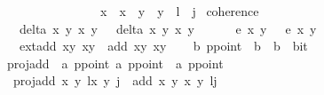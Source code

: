 \begin{isabellebody}
\ \ \ \ \ \ \ \ \ \ \ \ \ \ \ \ {\isacharparenleft}x{}\ {\isacharequal}\ x{}\ {\isasymand}\ y{}\ {\isacharequal}\ y{}\ {\isasymand}\ l\ {\isacharequal}\ j{\isacharparenright}{\isacharparenright}{\isacharbraceright}{\isachardoublequoteclose}\isanewline
\isanewline
\isanewline
{}\isamarkupfalse%
\ coherence{\isacharcolon}\isanewline
\ \ \ {\isachardoublequoteopen}delta\ x{}\ y{}\ x{}\ y{}\ {\isasymnoteq}\ {}{\isachardoublequoteclose}\ {\isachardoublequoteopen}delta{\isacharprime}\ x{}\ y{}\ x{}\ y{}\ {\isasymnoteq}\ {}{\isachardoublequoteclose}\ \isanewline
\ \ \ {\isachardoublequoteopen}e{\isacharprime}\ x{}\ y{}\ {\isacharequal}\ {}{\isachardoublequoteclose}\ {\isachardoublequoteopen}e{\isacharprime}\ x{}\ y{}\ {\isacharequal}\ {}{\isachardoublequoteclose}\isanewline
\ \ \ {\isachardoublequoteopen}ext{\isacharunderscore}add\ {\isacharparenleft}x{}{\isacharcomma}y{}{\isacharparenright}\ {\isacharparenleft}x{}{\isacharcomma}y{}{\isacharparenright}\ {\isacharequal}\ add\ {\isacharparenleft}x{}{\isacharcomma}y{}{\isacharparenright}\ {\isacharparenleft}x{}{\isacharcomma}y{}{\isacharparenright}{\isachardoublequoteclose}\isanewline
%
\isadelimproof
\ \ %
\endisadelimproof
%
\isatagproof
{}\isamarkupfalse%
%
\endisatagproof
{\isafoldproof}%
%
\isadelimproof
\isanewline
%
\endisadelimproof
\isanewline
{}\isamarkupfalse%
\ {\isacharparenleft}{\isacharprime}b{\isacharparenright}\ ppoint\ {\isacharequal}\ {\isacartoucheopen}{\isacharparenleft}{\isacharparenleft}{\isacharprime}b\ {\isasymtimes}\ {\isacharprime}b{\isacharparenright}\ {\isasymtimes}\ bit{\isacharparenright}{\isacartoucheclose}\isanewline
\isanewline
{}\isamarkupfalse%
\ proj{\isacharunderscore}add\ {\isacharcolon}{\isacharcolon}\ {\isachardoublequoteopen}{\isacharprime}a\ ppoint\ {\isasymtimes}{\isacharprime}a\ ppoint\ {\isasymRightarrow}\ {\isacharprime}a\ ppoint{\isachardoublequoteclose}\ \ \isanewline
\ \ {\isachardoublequoteopen}proj{\isacharunderscore}add\ {\isacharparenleft}{\isacharparenleft}{\isacharparenleft}x\ y\ l{\isacharparenright}{\isacharcomma}{\isacharparenleft}{\isacharparenleft}x\ y\ j{\isacharparenright}{\isacharparenright}\ {\isacharequal}\ {\isacharparenleft}add\ {\isacharparenleft}x\ y\ {\isacharparenleft}x\ y\ l{\isacharplus}j{\isacharparenright}{\isachardoublequoteclose}\isanewline

\end{isabellebody}
